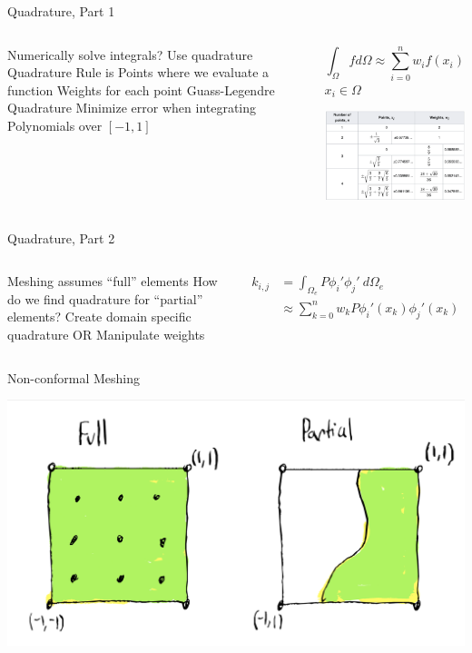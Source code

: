 \placelogofalse
\begin{frame}{Quadrature, Part 1}
\begin{columns}
\begin{outline}
  \1 Numerically solve integrals?
  \2 Use quadrature
  \1 Quadrature Rule is
  \2 Points where we evaluate a function
  \2 Weights for each point
  \1 Guass-Legendre Quadrature 
  \2 Minimize error when integrating Polynomials over $[-1, 1]$
\end{outline}

\begin{center}
$$
\int_{\Omega} f d \Omega \approx \sum_{i=0}^n w_i f(x_i)
$$
$x_i \in \Omega$

\vspace{1cm}

\includegraphics[width=5cm]{quadrature_table.png}

\end{center}
\end{columns}
\end{frame}
\placelogotrue

\begin{frame}{Quadrature, Part 2}
\begin{columns}
\begin{outline}
  \1 Meshing assumes ``full'' elements 
  \1 How do we find quadrature for ``partial'' elements?
  \2 Create domain specific quadrature
  \2 OR
  \2 Manipulate weights
\end{outline}

\begin{center}

\begin{align*}
k_{i,j} &= \int_{\Omega_e} P \phi_i' \phi_j' \ d \Omega_e \\
        &\approx \sum_{k=0}^n w_k P \phi_i'(x_k) \phi_j'(x_k)
\end{align*}

\end{center}
\end{columns}
\end{frame}

\placelogofalse
\begin{frame}{Non-conformal Meshing}
\centering
\begin{center}
  \includegraphics[width=0.4\linewidth]{element_example.png}

\end{center}
\end{frame}
\placelogotrue

